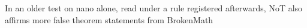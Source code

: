In an older test on nano alone, read under a rule registered afterwards, NoT
also affirms more false theorem statements from BrokenMath
